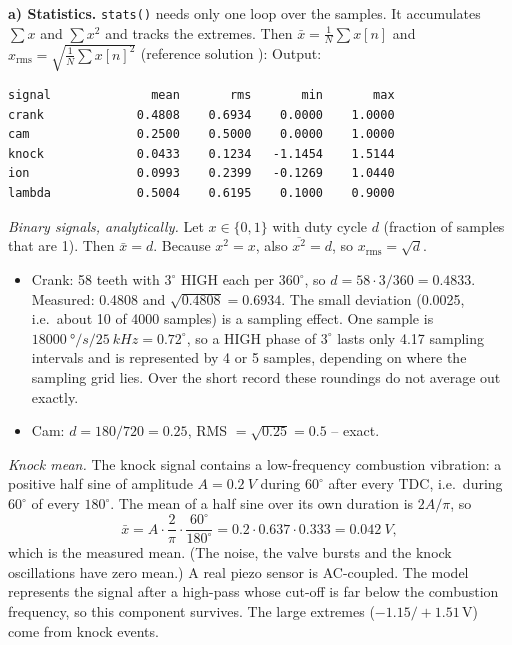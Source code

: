 \begin{solution}
\textbf{a) Statistics.} \texttt{stats()} needs only one loop over the
samples. It accumulates $\sum x$ and $\sum x^2$ and tracks the extremes. Then
$\bar x=\frac1N\sum x[n]$ and
$x_{\text{rms}}=\sqrt{\frac1N\sum x[n]^2}$ (reference solution
):
Output:
\begin{lstlisting}[style=shell,numbers=none]
signal              mean       rms       min       max
crank             0.4808    0.6934    0.0000    1.0000
cam               0.2500    0.5000    0.0000    1.0000
knock             0.0433    0.1234   -1.1454    1.5144
ion               0.0993    0.2399   -0.1269    1.0440
lambda            0.5004    0.6195    0.1000    0.9000
\end{lstlisting}
\emph{Binary signals, analytically.} Let $x\in\{0,1\}$ with duty cycle $d$
(fraction of samples that are 1). Then $\bar x=d$. Because $x^2=x$, also
$\overline{x^2}=d$, so $x_{\text{rms}}=\sqrt d$.
\begin{itemize}[itemsep=1pt]
  \item Crank: 58 teeth with $3^\circ$ HIGH each per $360^\circ$, so
    $d=58\cdot3/360=0.4833$. Measured: 0.4808 and
    $\sqrt{0.4808}=0.6934$. The small deviation (0.0025, i.e.\ about 10 of
    4000 samples) is a sampling effect. One sample is
    $\SI{18000}{\degree/s}/\SI{25}{kHz}=0.72^\circ$, so a HIGH phase of
    $3^\circ$ lasts only 4.17 sampling intervals and is represented by 4 or 5
    samples, depending on where the sampling grid lies. Over the short record
    these roundings do not average out exactly.
  \item Cam: $d=180/720=0.25$, RMS $=\sqrt{0.25}=0.5$ -- exact.
\end{itemize}
\emph{Knock mean.} The knock signal contains a low-frequency combustion
vibration: a positive half sine of amplitude $A=\SI{0.2}{V}$ during $60^\circ$
after every TDC, i.e.\ during $60^\circ$ of every $180^\circ$. The mean of a
half sine over its own duration is $2A/\pi$, so
\[ \bar x = A\cdot\frac{2}{\pi}\cdot\frac{60^\circ}{180^\circ}
   = 0.2\cdot0.637\cdot0.333 = \SI{0.042}{V}, \]
which is the measured mean. (The noise, the valve bursts and the knock
oscillations have zero mean.) A real piezo sensor is AC-coupled. The model
represents the signal after a high-pass whose cut-off is far below the
combustion frequency, so this component survives. The large extremes
($-1.15/+1.51$\,V) come from knock events.


\end{solution}
